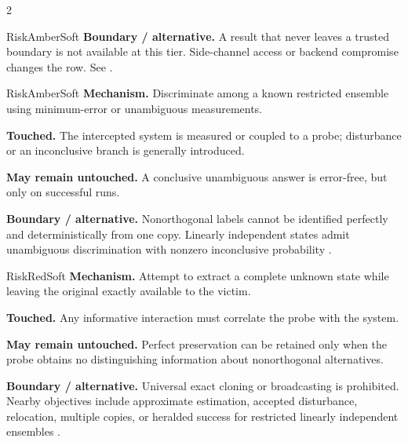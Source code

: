 \begin{multicols}{2}
\begin{matrixrecord}{RiskAmberSoft}
\textbf{Boundary / alternative.} A result that never leaves a trusted boundary is not available at this tier. Side-channel access or backend compromise changes the row. See \cite{jiang2024sidechannel,ashsaki2023primer}.

\hfill\matrixback
\end{matrixrecord}

\hypertarget{cell:A3}{}
\begin{matrixrecord}{RiskAmberSoft}
\textbf{Mechanism.} Discriminate among a known restricted ensemble using minimum-error or unambiguous measurements.

\textbf{Touched.} The intercepted system is measured or coupled to a probe; disturbance or an inconclusive branch is generally introduced.

\textbf{May remain untouched.} A conclusive unambiguous answer is error-free, but only on successful runs.

\textbf{Boundary / alternative.} Nonorthogonal labels cannot be identified perfectly and deterministically from one copy. Linearly independent states admit unambiguous discrimination with nonzero inconclusive probability \cite{chefles1998unambiguous,nielsen2010quantum}.

\hfill\matrixback
\end{matrixrecord}

\hypertarget{cell:A4}{}
\begin{matrixrecord}{RiskRedSoft}
\textbf{Mechanism.} Attempt to extract a complete unknown state while leaving the original exactly available to the victim.

\textbf{Touched.} Any informative interaction must correlate the probe with the system.

\textbf{May remain untouched.} Perfect preservation can be retained only when the probe obtains no distinguishing information about nonorthogonal alternatives.

\textbf{Boundary / alternative.} Universal exact cloning or broadcasting is prohibited. Nearby objectives include approximate estimation, accepted disturbance, relocation, multiple copies, or heralded success for restricted linearly independent ensembles \cite{wootters1982cloning,barnum1996broadcasting,duan1998probabilistic}.


\end{matrixrecord}
\end{multicols}
